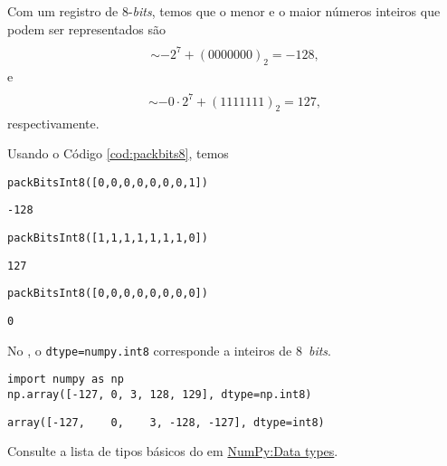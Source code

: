 \begin{ex}
  Com um registro de $8$-{\it bits}, temos que o menor e o maior números inteiros que podem ser representados são
  \begin{gather}
    [0 ~ 0 ~ 0 ~ 0 ~ 0 ~ 0 ~ 0 ~ 1] \\
    \sim -2^{7} + (0000000)_2 = -128,
  \end{gather}
  e
  \begin{gather}
    [1 ~ 1 ~ 1 ~ 1 ~ 1 ~ 1 ~ 1 ~ 0] \\
    \sim -0\cdot 2^7 + (1111111)_2 = 127,
  \end{gather}
  respectivamente.

  Usando o Código \ref{cod:packbits8}, temos

\begin{lstlisting}
packBitsInt8([0,0,0,0,0,0,0,1])
\end{lstlisting}

\begin{verbatim}
-128
\end{verbatim}

\begin{lstlisting}
packBitsInt8([1,1,1,1,1,1,1,0])
\end{lstlisting}

\begin{verbatim}
127
\end{verbatim}

\begin{lstlisting}
packBitsInt8([0,0,0,0,0,0,0,0])
\end{lstlisting}

\begin{verbatim}
0
\end{verbatim}
\end{ex}

\begin{obs}
  No {\numpy}, o \texttt{dtype=numpy.int8} corresponde a inteiros de 8~{\it bits}.

\begin{lstlisting}
import numpy as np
np.array([-127, 0, 3, 128, 129], dtype=np.int8)
\end{lstlisting}

\begin{verbatim}
array([-127,    0,    3, -128, -127], dtype=int8)
\end{verbatim}

Consulte a lista de tipos básicos do {\numpy} em \href{https://numpy.org/doc/stable/user/basics.types.html}{NumPy:Data types}.
\end{obs}

